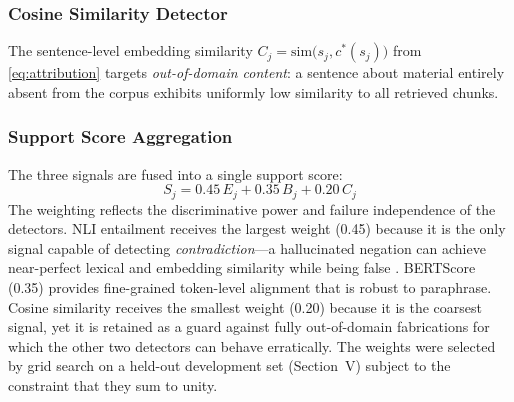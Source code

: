 \documentclass[journal]{IEEEtran}
\begin{document}
\subsubsection{Cosine Similarity Detector}
The sentence-level embedding similarity
$C_j = \mathrm{sim}\big(s_j, c^{*}(s_j)\big)$ from \eqref{eq:attribution}
targets \emph{out-of-domain content}: a sentence about material entirely
absent from the corpus exhibits uniformly low similarity to all retrieved
chunks.

\subsubsection{Support Score Aggregation}
The three signals are fused into a single support score:
\begin{equation}
S_j = 0.45\,E_j + 0.35\,B_j + 0.20\,C_j
\label{eq:support}
\end{equation}
The weighting reflects the discriminative power and failure independence of
the detectors. NLI entailment receives the largest weight (0.45) because it
is the only signal capable of detecting \emph{contradiction}---a
hallucinated negation can achieve near-perfect lexical and embedding
similarity while being false \cite{zhang2020bertscore,laban2022summac}.
BERTScore (0.35) provides fine-grained token-level alignment that is robust
to paraphrase. Cosine similarity receives the smallest weight (0.20) because
it is the coarsest signal, yet it is retained as a guard against fully
out-of-domain fabrications for which the other two detectors can behave
erratically. The weights were selected by grid search on a held-out
development set (Section~V) subject to the constraint that they sum to
unity.
\end{document}
